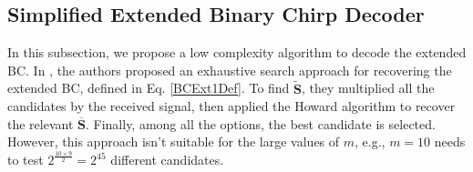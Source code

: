 \documentclass[lettersize,journal,onecolumn]{IEEEtran}
\begin{document}
\subsection{Simplified Extended Binary Chirp Decoder}
In this subsection, we propose a low complexity algorithm to decode the extended BC. In \cite{PitvalExtendedChirp21}, the authors proposed an exhaustive search approach for recovering the extended BC, defined in Eq. \eqref{BCExt1Def}. To find $\widetilde{\mathbf{S}}$, they multiplied all the candidates by the received signal, then applied the Howard algorithm to recover the relevant $\overline{\mathbf{S}}$. Finally, among all the options, the best candidate is selected. However, this approach isn't suitable for the large values of $m$, e.g., $m=10$ needs to test $2^{\frac{10 \times 9}{2}}=2^{45}$ different candidates.
\end{document}
